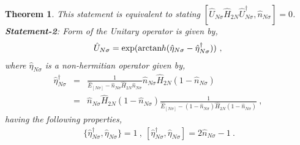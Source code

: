 \documentclass[12pt,a4paper]{article}
\newtheorem{theorem}{Theorem}
\begin{document}
\begin{theorem}
This statement is equivalent to stating $[\hat{U}_{N\sigma}\hat{H}_{2N}\hat{U}^{\dagger}_{N\sigma},\hat{n}_{N\sigma}]=0$.\\
\textbf{Statement-2}: Form of the Unitary operator is given by,
\begin{eqnarray}
\hat{U}_{N\sigma}=\exp(\arctan \hspace*{-0.07cm} h(\hat{\eta}_{N\sigma} -\hat{\eta}^{\dagger}_{N\sigma}))~,~\nonumber
\end{eqnarray}
where $\hat{\eta}_{N\sigma}$ is a non-hermitian operator given by,
\begin{eqnarray}
\hat{\eta}^{\dagger}_{N\sigma} &=& \frac{1}{\hat{E}_{[N\sigma]}-\hat{n}_{N\sigma}\hat{H}_{2N}\hat{n}_{N\sigma}}\hat{n}_{N\sigma}\hat{H}_{2N}(1-\hat{n}_{N\sigma})\nonumber\\
&=&\hat{n}_{N\sigma}\hat{H}_{2N}(1-\hat{n}_{N\sigma})\frac{1}{\hat{E}_{[N\sigma]} -(1-\hat{n}_{N\sigma})\hat{H}_{2N}(1-\hat{n}_{N\sigma})}~,~\nonumber
\end{eqnarray}
having the following properties,
\begin{eqnarray}
\lbrace\hat{\eta}^{\dagger}_{N\sigma},\hat{\eta}_{N\sigma}\rbrace =1 ~,~[\hat{\eta}^{\dagger}_{N\sigma},\hat{\eta}_{N\sigma}] =2\hat{n}_{N\sigma}-1~.\nonumber
\end{eqnarray}
\end{theorem}
\end{document}
